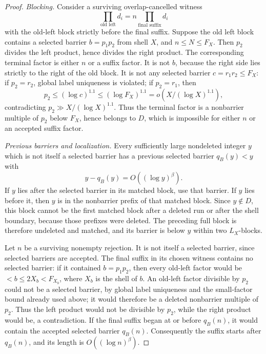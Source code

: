 \documentclass[11pt]{article}
\theoremstyle{definition}
\newcommand{\1}{\mathbf 1}
\begin{document}
\begin{proof}
\smallskip
\noindent\emph{Blocking.}
Consider a surviving overlap-cancelled witness
\[
  \prod_{\text{old left}} d_i
  =n\prod_{\text{final suffix}} d_i
\]
with the old-left block strictly before the final suffix.  Suppose the old
left block contains a selected barrier \(b=p_1p_2\) from shell \(X\), and
\(n\le N\le F_X\).  Then \(p_2\) divides the left product, hence divides the
right product.  The corresponding terminal factor is either \(n\) or a suffix
factor.  It is not \(b\), because the right side lies strictly to the right of
the old block.  It is not any selected barrier \(c=r_1r_2\le F_X\): if
\(p_2=r_2\), global label uniqueness is violated; if \(p_2=r_1\), then
\[
  p_2\le(\log c)^{1.1}\le(\log F_X)^{1.1}
  =o(X/(\log X)^{1.1}),
\]
contradicting \(p_2\gg X/(\log X)^{1.1}\).  Thus the terminal factor is a
nonbarrier multiple of \(p_2\) below \(F_X\), hence belongs to \(D\), which is
impossible for either \(n\) or an accepted suffix factor.

\smallskip
\noindent\emph{Previous barriers and localization.}
Every sufficiently large nondeleted integer \(y\) which is not itself a
selected barrier has a previous selected barrier \(q_B(y)<y\) with
\[
  y-q_B(y)=O((\log y)^\beta).
\]
If \(y\) lies after the selected barrier in its matched block, use that
barrier.  If \(y\) lies before it, then \(y\) is in the nonbarrier prefix of
that matched block.  Since \(y\notin D\), this block cannot be the first
matched block after a deleted run or after the shell boundary, because those
prefixes were deleted.  The preceding full block is therefore undeleted and
matched, and its barrier is below \(y\) within two \(L_X\)-blocks.

Let \(n\) be a surviving nonempty rejection.  It is not itself a selected
barrier, since selected barriers are accepted.  The final suffix in its
chosen witness contains no selected barrier: if it contained \(b=p_1p_2\),
then every old-left factor would be \(<b\le2X_b<F_{X_b}\), where \(X_b\) is
the shell of \(b\).  An old-left factor divisible by \(p_2\) could not be a
selected barrier, by global label uniqueness and the small-factor bound
already used above; it would therefore be a deleted nonbarrier multiple of
\(p_2\).  Thus the left product would not be divisible by \(p_2\), while the
right product would be, a contradiction.  If the final suffix began at or
before \(q_B(n)\), it would contain the accepted selected barrier \(q_B(n)\).
Consequently the suffix starts after \(q_B(n)\), and its length is
\(O((\log n)^\beta)\).


\end{proof}
\end{document}
